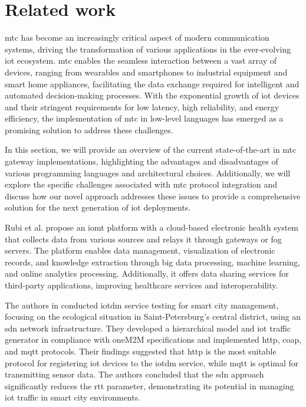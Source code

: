 \documentclass[a4paper,fleqn]{cas-dc}
\begin{document}
\section{Related work}
\label{relatedWork}
\gls{mtc} has become an increasingly critical aspect of modern communication systems, driving the transformation of various applications in the ever-evolving \gls{iot} ecosystem. \gls{mtc} enables the seamless interaction between a vast array of devices, ranging from wearables and smartphones to industrial equipment and smart home appliances, facilitating the data exchange required for intelligent and automated decision-making processes. With the exponential growth of \gls{iot} devices and their stringent requirements for low latency, high reliability, and energy efficiency, the implementation of \gls{mtc} in low-level languages has emerged as a promising solution to address these challenges.

In this section, we will provide an overview of the current state-of-the-art in \gls{mtc} gateway implementations, highlighting the advantages and disadvantages of various programming languages and architectural choices. Additionally, we will explore the specific challenges associated with \gls{mtc} protocol integration and discuss how our novel approach addresses these issues to provide a comprehensive solution for the next generation of \gls{iot} deployments.

Rubi et al. \cite{Rubi2019} propose an \gls{iomt} platform with a cloud-based electronic health system that collects data from various sources and relays it through gateways or fog servers. The platform enables data management, visualization of electronic records, and knowledge extraction through big data processing, machine learning, and online analytics processing. Additionally, it offers data sharing services for third-party applications, improving healthcare services and interoperability.

The authors in \cite{Volkov2017} conducted \gls{iotdm} service testing for smart city management, focusing on the ecological situation in Saint-Petersburg's central district, using an \gls{sdn} network infrastructure. They developed a hierarchical model and \gls{iot} traffic generator in compliance with oneM2M specifications and implemented \gls{http}, \gls{coap}, and \gls{mqtt} protocols. Their findings suggested that \gls{http} is the most suitable protocol for registering \gls{iot} devices to the \gls{iotdm} service, while \gls{mqtt} is optimal for transmitting sensor data. The authors concluded that the \gls{sdn} approach significantly reduces the \gls{rtt} parameter, demonstrating its potential in managing \gls{iot} traffic in smart city environments.
\end{document}
